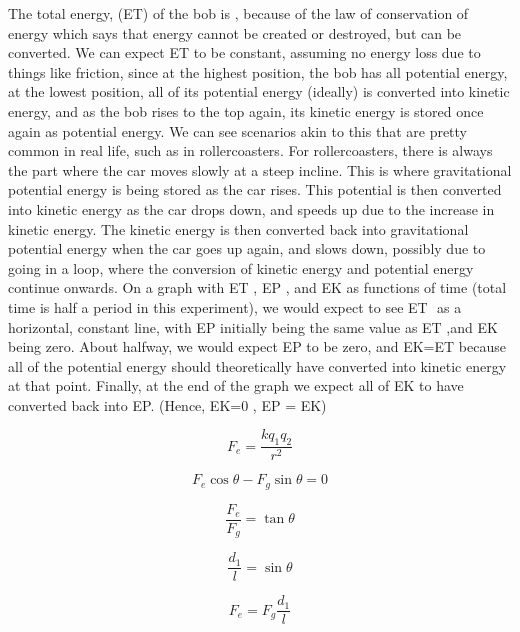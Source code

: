 \documentclass[letterpaper]{article}
\begin{document}
The total energy, (ET) of the bob is  , because of the law of conservation of energy which says that energy cannot be created or destroyed, but can be converted. We can expect ET to be constant, assuming no energy loss due to things like friction, since at the highest position, the bob has all potential energy, at the lowest position, all of its potential energy (ideally) is converted into kinetic energy, and as the bob rises to the top again, its kinetic energy is stored once again as potential energy. We can see scenarios akin to this that are pretty common in real life, such as in rollercoasters.  For rollercoasters, there is always the part where the car moves slowly at a steep incline. This is where gravitational potential energy is being stored as the car rises. This potential is then converted into kinetic energy as the car drops down, and speeds up due to the increase in kinetic energy. The kinetic energy is then converted back into gravitational potential energy when the car goes up again, and slows down, possibly due to going in a loop, where the conversion of kinetic energy and potential energy continue onwards.
On a graph with ET , EP , and EK  as functions of time (total time is half a period in this experiment), we would expect to see ET ­ as a horizontal, constant line, with EP initially being the same value as ET ,and EK being zero. About halfway, we would expect EP to be zero, and EK=ET because all of the potential energy should theoretically have converted into kinetic energy at that point. Finally, at the end of the graph we expect all of EK­ to have converted back into EP. (Hence, EK=0 , EP = EK)

  \begin{equation}
    F_e=\frac{k q_1 q_2}{r^2}
  \end{equation}

  \begin{equation}
    F_e \cos\theta - F_g \sin\theta=0
  \end{equation}

  \begin{equation}
    \frac{F_e}{F_g} = \tan\theta
  \end{equation}

  \begin{equation}
    \frac{d_1}{l}=\sin\theta
  \end{equation}

  \begin{equation}
    F_e=F_g\frac{d_1}{l}
  \end{equation}
\end{document}
